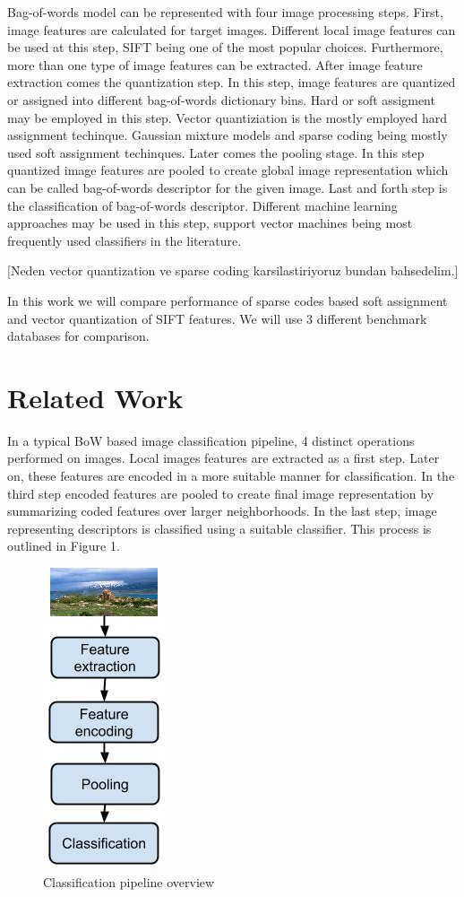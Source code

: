 \documentclass[conference]{IEEEtran}
\begin{document}
Bag-of-words model can be represented with four image processing steps. First, image features are calculated for target images. Different local image features can be used at this step, SIFT being one of the most popular choices. Furthermore, more than one type of image features can be extracted. After image feature extraction comes the quantization step. In this step, image features are quantized or assigned into different bag-of-words dictionary bins. Hard or soft assigment may be employed in this step. Vector quantiziation is the mostly employed hard assignment techinque. Gaussian mixture models and sparse coding being mostly used soft assignment techinques. Later comes the pooling stage. In this step quantized image features are pooled to create global image representation which can be called bag-of-words descriptor for the given image. Last and forth step is the classification of bag-of-words descriptor. Different machine learning approaches may be used in this step, support vector machines being most frequently used classifiers in the literature.

[Neden vector quantization ve sparse coding karsilastiriyoruz bundan bahsedelim.]

In this work we will compare performance of sparse codes based soft assignment and vector quantization of SIFT features. We will use 3 different benchmark databases for comparison.

\section {Related Work}

In a typical BoW based image classification pipeline, 4 distinct operations performed on images. Local images features are extracted as a first step. Later on, these features are encoded in a more suitable manner for classification. In the third step encoded features are pooled to create final image representation by summarizing coded features over larger neighborhoods. In the last step, image representing descriptors is classified using a suitable classifier. This process is outlined in Figure 1.

\begin{figure}[h]
\centering
\includegraphics[scale=0.5]{data/classification_pipeline.jpg}
\caption{Classification pipeline overview}
\label{figure1}
\end{figure}
\end{document}
